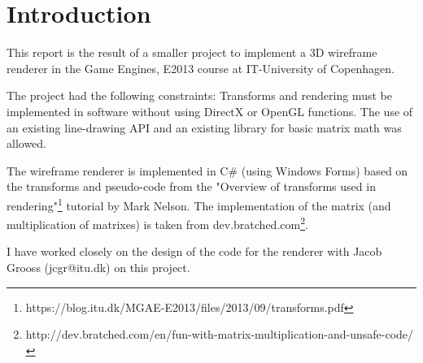 \section{Introduction}
\label{Intro}
This report is the result of a smaller project to implement a 3D wireframe renderer in the Game Engines, E2013 course at IT-University of Copenhagen.

The project had the following constraints: Transforms and rendering must be implemented in software without using DirectX or OpenGL functions. The use of an existing line-drawing API and an existing library for basic matrix math was allowed.

The wireframe renderer is implemented in C\# (using Windows Forms) based on the transforms and pseudo-code from the "Overview of transforms used in rendering"\footnote{https://blog.itu.dk/MGAE-E2013/files/2013/09/transforms.pdf} tutorial by Mark Nelson. The implementation of the matrix (and multiplication of matrixes) is taken from dev.bratched.com\footnote{http://dev.bratched.com/en/fun-with-matrix-multiplication-and-unsafe-code/}.

I have worked closely on the design of the code for the renderer with Jacob Grooss (jcgr@itu.dk) on this project.